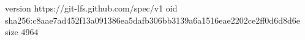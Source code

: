 version https://git-lfs.github.com/spec/v1
oid sha256:c8aae7ad452f13a091386ea5dafb306bb3139a6a1516eae2202ce2ff0d6d8d6e
size 4964
